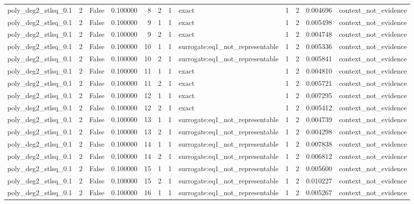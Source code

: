 \begin{tabular}{lrrrrrrlrrrl}
poly\_deg2\_stlsq\_0.1 & 2 & False & 0.100000 & 8 & 2 & 1 & exact & 1 & 2 & 0.004696 & context\_not\_evidence \\
poly\_deg2\_stlsq\_0.1 & 2 & False & 0.100000 & 9 & 1 & 1 & exact & 1 & 2 & 0.005498 & context\_not\_evidence \\
poly\_deg2\_stlsq\_0.1 & 2 & False & 0.100000 & 9 & 2 & 1 & exact & 1 & 2 & 0.004748 & context\_not\_evidence \\
poly\_deg2\_stlsq\_0.1 & 2 & False & 0.100000 & 10 & 1 & 1 & surrogate:eq1\_not\_representable & 1 & 2 & 0.005336 & context\_not\_evidence \\
poly\_deg2\_stlsq\_0.1 & 2 & False & 0.100000 & 10 & 2 & 1 & surrogate:eq1\_not\_representable & 1 & 2 & 0.005841 & context\_not\_evidence \\
poly\_deg2\_stlsq\_0.1 & 2 & False & 0.100000 & 11 & 1 & 1 & exact & 1 & 2 & 0.004810 & context\_not\_evidence \\
poly\_deg2\_stlsq\_0.1 & 2 & False & 0.100000 & 11 & 2 & 1 & exact & 1 & 2 & 0.005721 & context\_not\_evidence \\
poly\_deg2\_stlsq\_0.1 & 2 & False & 0.100000 & 12 & 1 & 1 & exact & 1 & 2 & 0.007295 & context\_not\_evidence \\
poly\_deg2\_stlsq\_0.1 & 2 & False & 0.100000 & 12 & 2 & 1 & exact & 1 & 2 & 0.005412 & context\_not\_evidence \\
poly\_deg2\_stlsq\_0.1 & 2 & False & 0.100000 & 13 & 1 & 1 & surrogate:eq1\_not\_representable & 1 & 2 & 0.004739 & context\_not\_evidence \\
poly\_deg2\_stlsq\_0.1 & 2 & False & 0.100000 & 13 & 2 & 1 & surrogate:eq1\_not\_representable & 1 & 2 & 0.004298 & context\_not\_evidence \\
poly\_deg2\_stlsq\_0.1 & 2 & False & 0.100000 & 14 & 1 & 1 & surrogate:eq1\_not\_representable & 1 & 2 & 0.007838 & context\_not\_evidence \\
poly\_deg2\_stlsq\_0.1 & 2 & False & 0.100000 & 14 & 2 & 1 & surrogate:eq1\_not\_representable & 1 & 2 & 0.006812 & context\_not\_evidence \\
poly\_deg2\_stlsq\_0.1 & 2 & False & 0.100000 & 15 & 1 & 1 & surrogate:eq1\_not\_representable & 1 & 2 & 0.005600 & context\_not\_evidence \\
poly\_deg2\_stlsq\_0.1 & 2 & False & 0.100000 & 15 & 2 & 1 & surrogate:eq1\_not\_representable & 1 & 2 & 0.010227 & context\_not\_evidence \\
poly\_deg2\_stlsq\_0.1 & 2 & False & 0.100000 & 16 & 1 & 1 & surrogate:eq1\_not\_representable & 1 & 2 & 0.005267 & context\_not\_evidence \\

\end{tabular}
